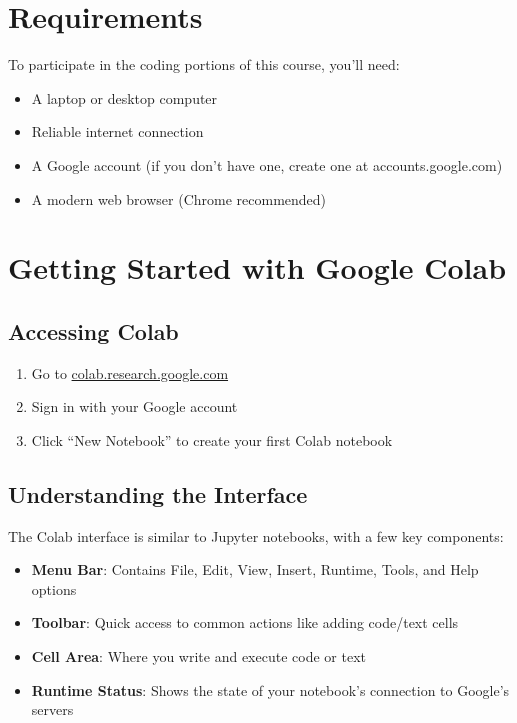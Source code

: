 \documentclass[
  letterpaper,
  DIV=11,
  numbers=noendperiod]{scrreprt}
\providecommand{\tightlist}{%
  \setlength{\itemsep}{0pt}\setlength{\parskip}{0pt}}\usepackage{longtable,booktabs,array}
\begin{document}
\hypertarget{requirements}{%
\section{Requirements}\label{requirements}}

To participate in the coding portions of this course, you'll need:

\begin{itemize}
\tightlist
\item
  A laptop or desktop computer
\item
  Reliable internet connection
\item
  A Google account (if you don't have one, create one at
  accounts.google.com)
\item
  A modern web browser (Chrome recommended)
\end{itemize}

\hypertarget{getting-started-with-google-colab}{%
\section{Getting Started with Google
Colab}\label{getting-started-with-google-colab}}

\hypertarget{accessing-colab}{%
\subsection{Accessing Colab}\label{accessing-colab}}

\begin{enumerate}
\def\labelenumi{\arabic{enumi}.}
\tightlist
\item
  Go to
  \href{https://colab.research.google.com}{colab.research.google.com}
\item
  Sign in with your Google account
\item
  Click ``New Notebook'' to create your first Colab notebook
\end{enumerate}

\hypertarget{understanding-the-interface}{%
\subsection{Understanding the
Interface}\label{understanding-the-interface}}

The Colab interface is similar to Jupyter notebooks, with a few key
components:

\begin{itemize}
\tightlist
\item
  \textbf{Menu Bar}: Contains File, Edit, View, Insert, Runtime, Tools,
  and Help options
\item
  \textbf{Toolbar}: Quick access to common actions like adding code/text
  cells
\item
  \textbf{Cell Area}: Where you write and execute code or text
\item
  \textbf{Runtime Status}: Shows the state of your notebook's connection
  to Google's servers
\end{itemize}
\end{document}
